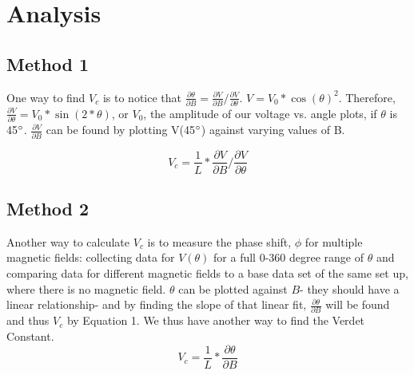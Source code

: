 \documentclass[prb,preprint]{revtex4-1}
\begin{document}
\section{Analysis}
{\subsection{Method 1}

{One way to find $V_{c}$ is to notice that $\frac{\partial \theta}{\partial B}=\frac{\partial V}{\partial B}/ \frac{\partial V}{\partial \theta}$.     $V=V_{0}*\cos(\theta)^{2}$.  Therefore,  $ \frac{\partial V}{\partial \theta} = V_{0}*\sin(2*\theta)$, or $V_{0}$, the amplitude of our voltage vs. angle plots, if $\theta$ is 45$\degree$.  $\frac{\partial V}{\partial B}$ can be found by plotting V(45$\degree$) against varying values of B. }

\begin{equation}
V_{c} =\frac{1}{L} * \frac{\partial V}{\partial B} /  \frac{\partial V}{\partial \theta} 
\end{equation}

\subsection{Method 2}

Another way to calculate $V_{c}$ is to measure the phase shift, $\phi$ for multiple magnetic fields:  collecting data for $V(\theta)$ for a full 0-360 degree range of $\theta$ and comparing data for different magnetic fields to a base data set of the same set up, where there is no magnetic field.  $\theta$ can be plotted against $B$- they should have a linear relationship- and by finding the slope of that linear fit, $\frac{\partial \theta}{\partial B}$ will be found and thus $V_{c}$ by Equation 1. We thus have another way to find the Verdet Constant.
\begin{equation}
V_{c} =\frac{1}{L} * \frac{\partial \theta}{\partial B} 
\end{equation}

}
\end{document}
